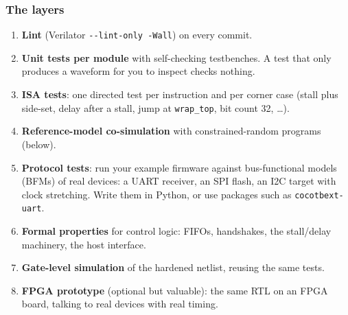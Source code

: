 \subsubsection{The layers}
\begin{enumerate}[label=\arabic*.]
  \item \textbf{Lint} (Verilator \texttt{-{}-lint-only -Wall}) on every commit.
  \item \textbf{Unit tests per module} with self-checking testbenches. A
    test that only produces a waveform for you to inspect checks nothing.
  \item \textbf{ISA tests}: one directed test per instruction and per corner
    case (stall plus side-set, delay after a stall, jump at
    \texttt{wrap\_top}, bit count 32, \ldots).
  \item \textbf{Reference-model co-simulation} with constrained-random
    programs (below).
  \item \textbf{Protocol tests}: run your example firmware against
    bus-functional models (BFMs) of real devices: a UART receiver, an SPI
    flash, an I2C target with clock stretching. Write them in Python, or
    use packages such as \texttt{cocotbext-uart}.
  \item \textbf{Formal properties} for control logic: FIFOs, handshakes,
    the stall/delay machinery, the host interface.
  \item \textbf{Gate-level simulation} of the hardened netlist, reusing the
    same tests.
  \item \textbf{FPGA prototype} (optional but valuable): the same RTL on an
    FPGA board, talking to real devices with real timing.
\end{enumerate}


